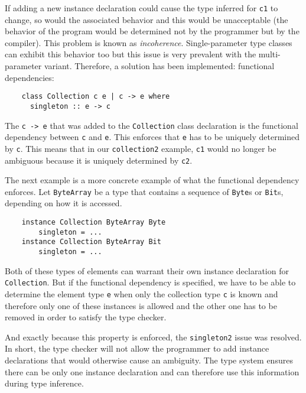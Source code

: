If adding a new instance declaration could cause the type inferred for
\texttt{c1} to change, so would the associated behavior and this would be
unacceptable (the behavior of the program would be determined not by the programmer but by the compiler). This problem is known as {\em incoherence}.
Single-parameter type classes can exhibit this behavior
too but this issue is very prevalent with the
multi-parameter variant. Therefore, a solution has been implemented: functional
dependencies:
\begin{verbatim}
    class Collection c e | c -> e where
      singleton :: e -> c
\end{verbatim}
The \texttt{c -> e} that was added to the \texttt{Collection} class
declaration is the functional dependency between \texttt{c} and \texttt{e}. This
enforces that \texttt{e} has to be uniquely determined by \texttt{c}.
This means that in our \texttt{collection2} example, \texttt{c1} would no longer
be ambiguous because it is uniquely determined by \texttt{c2}.

The next example is a more concrete example of what the functional dependency
enforces. Let \texttt{ByteArray} be a type that contains a sequence of
\texttt{Byte}s or \texttt{Bit}s, depending on how it is accessed.
\begin{verbatim}
    instance Collection ByteArray Byte
        singleton = ...
    instance Collection ByteArray Bit
        singleton = ...
\end{verbatim}
Both of these types of elements can warrant their own instance declaration for
\texttt{Collection}. But if the functional dependency is specified, we have to
be able to determine the element type \texttt{e} when only the collection
type \texttt{c} is known and therefore only one of these instances is allowed
and the other one has to be removed in order to satisfy the type checker.

And exactly because this property is enforced, the \texttt{singleton2} issue was
resolved. In short, the type checker will not allow the programmer to add instance
declarations that would otherwise cause an ambiguity. The type system ensures
there can be only one instance declaration and can therefore use this
information during type inference.

